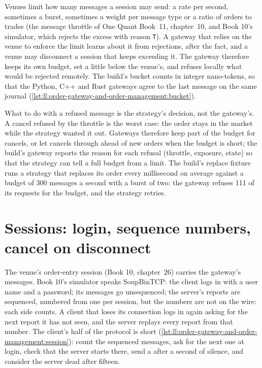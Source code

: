 Venues limit how many messages a session may send: a rate per second, sometimes a burst, sometimes a weight per message type
or a ratio of orders to trades (the message throttle of One Quant Book~11, chapter~10, and Book 10's simulator, which rejects
the excess with reason \texttt{T}). A gateway that relies on the venue to enforce the limit learns about it from rejections,
after the fact, and a venue may disconnect a session that keeps exceeding it. The gateway therefore keeps its own budget, set
a little below the venue's, and refuses locally what would be rejected remotely. The build's bucket counts in integer
nano-tokens, so that the Python, C++ and Rust gateways agree to the last message on the same journal
(\cref{lst:ll:order-gateway-and-order-management:bucket}).

\label{lst:ll:order-gateway-and-order-management:bucket}

What to do with a refused message is the strategy's decision, not the gateway's. A cancel refused by the throttle is the worst
case: the order stays in the market while the strategy wanted it out. Gateways therefore keep part of the budget for cancels,
or let cancels through ahead of new orders when the budget is short; the build's gateway reports the reason for each refusal
(throttle, exposure, state) so that the strategy can tell a full budget from a limit. The build's replace fixture runs a
strategy that replaces its order every millisecond on average against a budget of 300 messages a second with a burst of two:
the gateway refuses 111 of its requests for the budget, and the strategy retries.

\section{Sessions: login, sequence numbers, cancel on disconnect}

The venue's order-entry session (Book 10, chapter~26) carries the gateway's messages. Book 10's simulator speaks SoupBinTCP:
the client logs in with a user name and a password; its messages go unsequenced; the server's reports are sequenced, numbered
from one per session, but the numbers are not on the wire: each side counts. A client that loses its connection logs in again
asking for the next report it has not seen, and the server replays every report from that number. The client's half of the
protocol is short (\cref{lst:ll:order-gateway-and-order-management:session}): count the sequenced messages, ask for the next
one at login, check that the server starts there, send a  after a second of silence, and consider the server dead
after fifteen.


